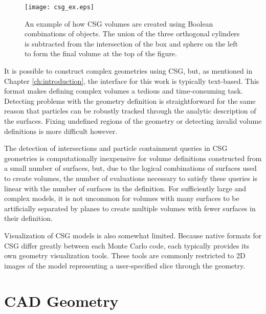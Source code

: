 \begin{figure}[h]
  \centering
  \texttt{[image: csg\_ex.eps]}
  \caption[Example of CSG Boolean operations.]{An example of how CSG volumes are created using Boolean combinations
    of objects. The union of the three orthogonal cylinders is
    subtracted from the intersection of the box and sphere on the left to form
    the final volume at the top of the figure.}
  \label{fig:csg_ex}
\end{figure}

It is possible to construct complex geometries using CSG, but, as mentioned in
Chapter \ref{ch:introduction}, the interface for this work is typically
text-based. This format makes defining complex volumes a tedious and
time-consuming task. Detecting problems with the geometry definition is
straightforward for the same reason that particles can be robustly tracked
through the analytic description of the surfaces. Fixing
undefined regions of the geometry or detecting invalid volume definitions is
more difficult however.

The detection of intersections and particle containment queries in CSG
geometries is computationally inexpensive for volume definitions constructed
from a small number of surfaces, but, due to the logical combinations of
surfaces used to create volumes, the number of evaluations necessary to satisfy
these queries is linear with the number of surfaces in the definition. For
sufficiently large and complex models, it is not uncommon for volumes with many
surfaces to be artificially separated by planes to create multiple volumes with
fewer surfaces in their definition.

Visualization of CSG models is also somewhat limited. Because native formats for
CSG differ greatly between each Monte Carlo code, each typically provides its
own geometry visualization tools. These tools are commonly restricted to 2D
images of the model representing a user-specified slice through the
geometry.


\section{CAD Geometry}


